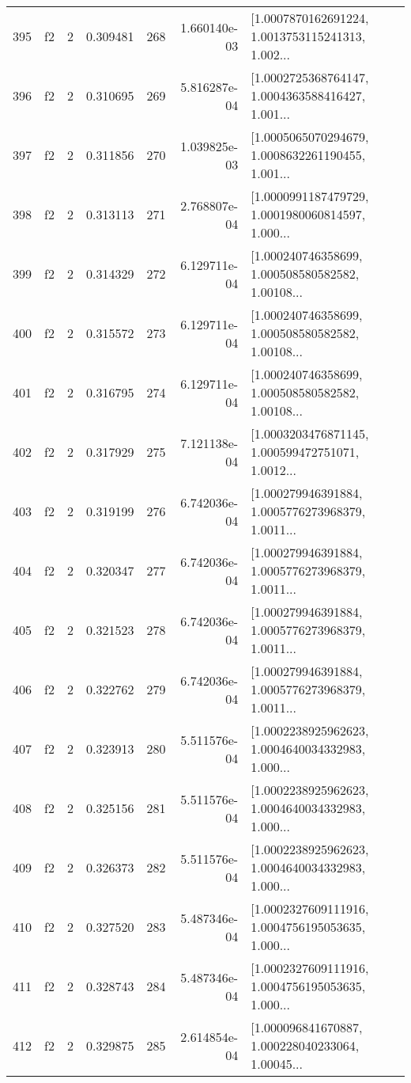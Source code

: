 \begin{tabular}{lllrlrl}
395 &  f2 &   2 &  0.309481 &  268 &  1.660140e-03 &  [1.0007870162691224, 1.0013753115241313, 1.002... \\
396 &  f2 &   2 &  0.310695 &  269 &  5.816287e-04 &  [1.0002725368764147, 1.0004363588416427, 1.001... \\
397 &  f2 &   2 &  0.311856 &  270 &  1.039825e-03 &  [1.0005065070294679, 1.0008632261190455, 1.001... \\
398 &  f2 &   2 &  0.313113 &  271 &  2.768807e-04 &  [1.0000991187479729, 1.0001980060814597, 1.000... \\
399 &  f2 &   2 &  0.314329 &  272 &  6.129711e-04 &  [1.000240746358699, 1.000508580582582, 1.00108... \\
400 &  f2 &   2 &  0.315572 &  273 &  6.129711e-04 &  [1.000240746358699, 1.000508580582582, 1.00108... \\
401 &  f2 &   2 &  0.316795 &  274 &  6.129711e-04 &  [1.000240746358699, 1.000508580582582, 1.00108... \\
402 &  f2 &   2 &  0.317929 &  275 &  7.121138e-04 &  [1.0003203476871145, 1.000599472751071, 1.0012... \\
403 &  f2 &   2 &  0.319199 &  276 &  6.742036e-04 &  [1.000279946391884, 1.0005776273968379, 1.0011... \\
404 &  f2 &   2 &  0.320347 &  277 &  6.742036e-04 &  [1.000279946391884, 1.0005776273968379, 1.0011... \\
405 &  f2 &   2 &  0.321523 &  278 &  6.742036e-04 &  [1.000279946391884, 1.0005776273968379, 1.0011... \\
406 &  f2 &   2 &  0.322762 &  279 &  6.742036e-04 &  [1.000279946391884, 1.0005776273968379, 1.0011... \\
407 &  f2 &   2 &  0.323913 &  280 &  5.511576e-04 &  [1.0002238925962623, 1.0004640034332983, 1.000... \\
408 &  f2 &   2 &  0.325156 &  281 &  5.511576e-04 &  [1.0002238925962623, 1.0004640034332983, 1.000... \\
409 &  f2 &   2 &  0.326373 &  282 &  5.511576e-04 &  [1.0002238925962623, 1.0004640034332983, 1.000... \\
410 &  f2 &   2 &  0.327520 &  283 &  5.487346e-04 &  [1.0002327609111916, 1.0004756195053635, 1.000... \\
411 &  f2 &   2 &  0.328743 &  284 &  5.487346e-04 &  [1.0002327609111916, 1.0004756195053635, 1.000... \\
412 &  f2 &   2 &  0.329875 &  285 &  2.614854e-04 &  [1.000096841670887, 1.000228040233064, 1.00045... \\

\end{tabular}
